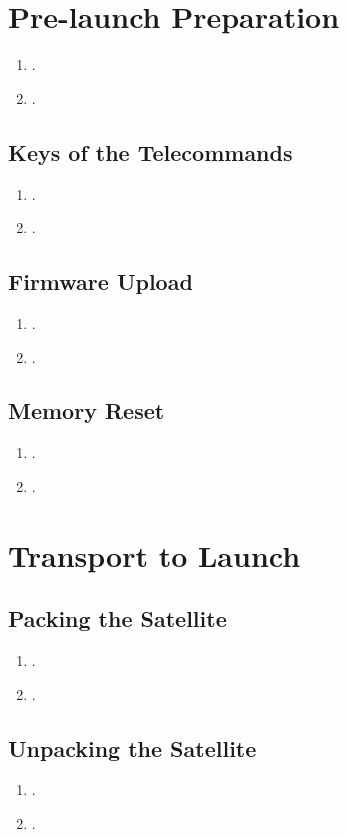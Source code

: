 \section{Pre-launch Preparation}

\begin{enumerate}
    \item .
    \item .
\end{enumerate}

\subsection{Keys of the Telecommands}

\begin{enumerate}
    \item .
    \item .
\end{enumerate}

\subsection{Firmware Upload}

\begin{enumerate}
    \item .
    \item .
\end{enumerate}

\subsection{Memory Reset}

\begin{enumerate}
    \item .
    \item .
\end{enumerate}

\section{Transport to Launch}

\subsection{Packing the Satellite}

\begin{enumerate}
    \item .
    \item .
\end{enumerate}

\subsection{Unpacking the Satellite}

\begin{enumerate}
    \item .
    \item .
\end{enumerate}
